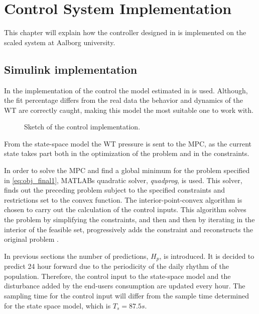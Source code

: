 \chapter{Control System Implementation}
\label{implementation_of_controller}

This chapter will explain how the controller designed in  is implemented on the scaled system at Aalborg university.  

\section{Simulink implementation}
\label{simulink_intro}
In the implementation of the control the model estimated in  is used. Although, the fit percentage differs from the real data the behavior and dynamics of the WT are correctly caught, making this model the most suitable one to work with. 

\begin{figure}[H]
\centering
 
\caption{Sketch of the control implementation.}
\label{fig:control_sketch}
\end{figure}

From the state-space model the WT pressure is sent to the MPC, as the current state takes part both in the optimization of the problem and in the constraints.

In order to solve the MPC and find a global minimum for the problem specified in \eqref{eq:obj_final1},  MATLABs quadratic solver, \textit{quadprog}, is used. This solver, finds out the preceding problem subject to the specified constraints and restrictions set to the convex function. The interior-point-convex algorithm is chosen to carry out the calculation of the control inputs. This algorithm solves the problem by simplifying the constraints, and then and then by iterating in the interior of the feasible set, progressively adds the constraint and reconstructs the original problem \cite{Convex_optimization}. 



In previous sections the number of predictions, $H_p$, is introduced. It is decided to predict 24 hour forward due to the periodicity of the daily rhythm of the population. Therefore, the control input to the state-space model and the disturbance added by the end-users consumption are updated every hour. The sampling time for the control input will differ from the sample time determined for the state space model, which is $T_s = 87.5s$. 

